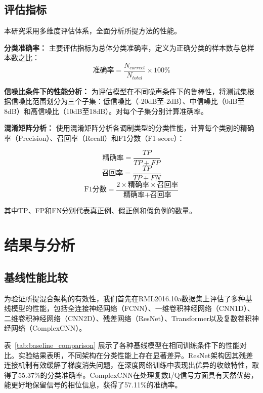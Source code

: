 \documentclass[conference]{IEEEtran}
\begin{document}
\subsection{评估指标}

本研究采用多维度评估体系，全面分析所提方法的性能。

\textbf{分类准确率：}
主要评估指标为总体分类准确率，定义为正确分类的样本数与总样本数之比：
\begin{equation}
\text{准确率} = \frac{N_{correct}}{N_{total}} \times 100\%
\end{equation}

\textbf{信噪比条件下的性能分析：}
为评估模型在不同噪声条件下的鲁棒性，将测试集根据信噪比范围划分为三个子集：低信噪比（-20dB至-2dB）、中信噪比（0dB至8dB）和高信噪比（10dB至18dB）。对每个子集分别计算准确率。

\textbf{混淆矩阵分析：}
使用混淆矩阵分析各调制类型的分类性能，计算每个类别的精确率（Precision）、召回率（Recall）和F1分数（F1-score）：

\begin{equation}
\text{精确率} = \frac{TP}{TP + FP}
\end{equation}
\begin{equation}
\text{召回率} = \frac{TP}{TP + FN}
\end{equation}
\begin{equation}
\text{F1分数} = \frac{2 \times \text{精确率} \times \text{召回率}}{\text{精确率} + \text{召回率}}
\end{equation}

其中TP、FP和FN分别代表真正例、假正例和假负例的数量。

\section{结果与分析}

\subsection{基线性能比较}

为验证所提混合架构的有效性，我们首先在RML2016.10a数据集上评估了多种基线模型的性能，包括全连接神经网络（FCNN）、一维卷积神经网络（CNN1D）、二维卷积神经网络（CNN2D）、残差网络（ResNet）、Transformer以及复数卷积神经网络（ComplexCNN）。

表~\ref{tab:baseline_comparison} 展示了各种基线模型在相同训练条件下的性能对比。实验结果表明，不同架构在分类性能上存在显著差异。ResNet架构因其残差连接机制有效缓解了梯度消失问题，在深度网络训练中表现出优异的收敛特性，取得了55.37\%的分类准确率。ComplexCNN在处理复数I/Q信号方面具有天然优势，能更好地保留信号的相位信息，获得了57.11\%的准确率。
\end{document}
